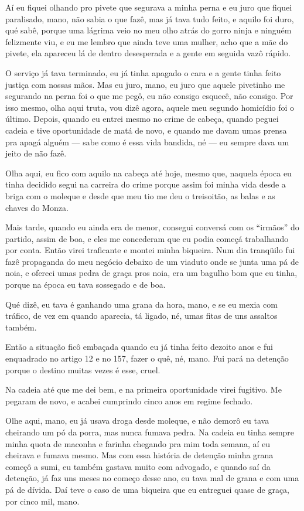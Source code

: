 Aí eu fiquei olhando pro pivete que segurava a minha perna e eu juro que
fiquei paralisado, mano, não sabia o que fazê, mas já tava tudo feito, e
aquilo foi duro, qué sabê, porque uma lágrima veio no meu olho atrás do
gorro ninja e ninguém felizmente viu, e eu me lembro que ainda teve uma
mulher, acho que a mãe do pivete, ela apareceu lá de dentro desesperada
e a gente em seguida vazô rápido.

O serviço já tava terminado, eu já tinha apagado o cara e a gente tinha
feito justiça com nossas mãos. Mas eu juro, mano, eu juro que aquele
pivetinho me segurando na perna foi o que me pegô, eu não consigo
esquecê, não consigo. Por isso mesmo, olha aqui truta, vou dizê agora,
aquele meu segundo homicídio foi o último. Depois, quando eu entrei
mesmo no crime de cabeça, quando peguei cadeia e tive oportunidade de
matá de novo, e quando me davam umas prensa pra apagá alguém --- sabe
como é essa vida bandida, né --- eu sempre dava um jeito de não fazê.

Olha aqui, eu fico com aquilo na cabeça até hoje, mesmo que, naquela
época eu tinha decidido segui na carreira do crime porque assim foi
minha vida desde a briga com o moleque e desde que meu tio me deu o
treisoitão, as balas e as chaves do Monza.

Mais tarde, quando eu ainda era de menor, consegui conversá com os
``irmãos'' do partido, assim de boa, e eles me concederam que eu podia
começá trabalhando por conta. Então virei traficante e montei minha
biqueira. Num dia tranqüilo fui fazê propaganda do meu negócio debaixo
de um viaduto onde se junta uma pá de noia, e ofereci umas pedra de
graça pros noia, era um bagulho bom que eu tinha, porque na época eu
tava sossegado e de boa.

Qué dizê, eu tava é ganhando uma grana da hora, mano, e se eu mexia com
tráfico, de vez em quando aparecia, tá ligado, né, umas fitas de uns
assaltos também.

Então a situação ficô embaçada quando eu já tinha feito dezoito anos e
fui enquadrado no artigo 12 e no 157, fazer o quê, né, mano. Fui pará na
detenção porque o destino muitas vezes é esse, cruel.

Na cadeia até que me dei bem, e na primeira oportunidade virei fugitivo.
Me pegaram de novo, e acabei cumprindo cinco anos em regime fechado.

Olhe aqui, mano, eu já usava droga desde moleque, e não demorô eu tava
cheirando um pó da porra, mas nunca fumava pedra. Na cadeia eu tinha
sempre minha quota de maconha e farinha chegando pra mim toda semana, aí
eu cheirava e fumava mesmo. Mas com essa história de detenção minha
grana começô a sumi, eu também gastava muito com advogado, e quando saí
da detenção, já faz uns meses no começo desse ano, eu tava mal de grana
e com uma pá de dívida. Daí teve o caso de uma biqueira que eu entreguei
quase de graça, por cinco mil, mano.

